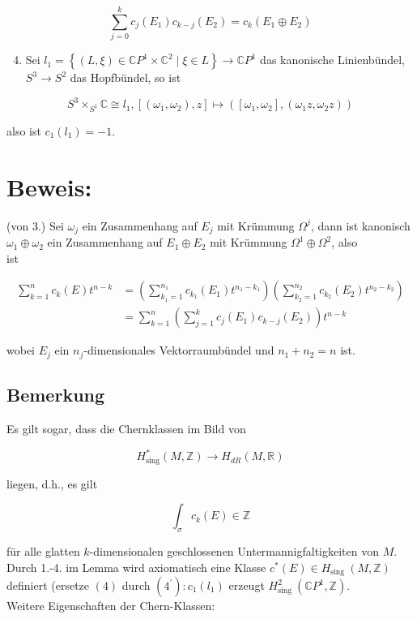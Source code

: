 \documentclass[10pt, letterpaper]{article}
\begin{document}
$$
\sum_{j=0}^{k} c_{j}\left(E_{1}\right) c_{k-j}\left(E_{2}\right)=c_{k}\left(E_{1} \oplus E_{2}\right)
$$

\begin{enumerate}
  \setcounter{enumi}{3}
  \item Sei $l_{1}=\left\{(L, \xi) \in \mathbb{C} P^{1} \times \mathbb{C}^{2} \mid \xi \in L\right\} \rightarrow \mathbb{C} P^{1}$ das kanonische Linienbündel, $S^{3} \rightarrow S^{2}$ das Hopfbündel, so ist
\end{enumerate}

$$
S^{3} \times_{S^{1}} \mathbb{C} \cong l_{1},\left[\left(\omega_{1}, \omega_{2}\right), z\right] \mapsto\left(\left[\omega_{1}, \omega_{2}\right],\left(\omega_{1} z, \omega_{2} z\right)\right)
$$

also ist $c_{1}\left(l_{1}\right)=-1$.

\section*{Beweis:}
(von 3.) Sei $\omega_{j}$ ein Zusammenhang auf $E_{j}$ mit Krümmung $\Omega^{j}$, dann ist kanonisch $\omega_{1} \oplus \omega_{2}$ ein Zusammenhang auf $E_{1} \oplus E_{2}$ mit Krümmung $\Omega^{1} \oplus \Omega^{2}$, also\\
ist

$$
\begin{aligned}
\sum_{k=1}^{n} c_{k}(E) t^{n-k} & =\left(\sum_{k_{1}=1}^{n_{1}} c_{k_{1}}\left(E_{1}\right) t^{n_{1}-k_{1}}\right)\left(\sum_{k_{2}=1}^{n_{2}} c_{k_{2}}\left(E_{2}\right) t^{n_{2}-k_{2}}\right) \\
& =\sum_{k=1}^{n}\left(\sum_{j=1}^{k} c_{j}\left(E_{1}\right) c_{k-j}\left(E_{2}\right)\right) t^{n-k}
\end{aligned}
$$

wobei $E_{j}$ ein $n_{j}$-dimensionales Vektorraumbündel und $n_{1}+n_{2}=n$ ist.

\subsection*{Bemerkung}
Es gilt sogar, dass die Chernklassen im Bild von

$$
H_{\mathrm{sing}}^{*}(M, \mathbb{Z}) \rightarrow H_{d R}(M, \mathbb{R})
$$

liegen, d.h., es gilt

$$
\int_{\sigma} c_{k}(E) \in \mathbb{Z}
$$

für alle glatten $k$-dimensionalen geschlossenen Untermannigfaltigkeiten von $M$.\\
Durch 1.-4. im Lemma wird axiomatisch eine Klasse $c^{*}(E) \in H_{\text {sing }}(M, \mathbb{Z})$ definiert (ersetze $(4)$ durch $\left(4^{\prime}\right): c_{1}\left(l_{1}\right)$ erzeugt $H_{\text {sing }}^{2}\left(\mathbb{C} P^{1}, \mathbb{Z}\right)$.\\
Weitere Eigenschaften der Chern-Klassen:
\end{document}
